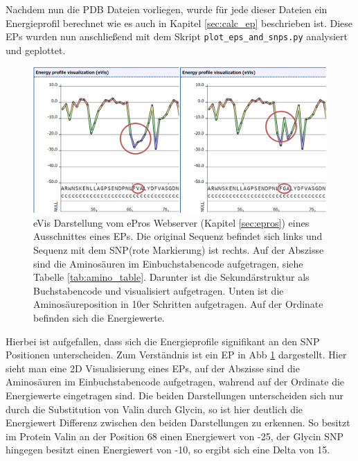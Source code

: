 Nachdem nun die \ac{PDB} Dateien vorliegen, wurde für jede dieser Dateien ein Energieprofil berechnet wie es auch in Kapitel \ref{sec:calc_ep} beschrieben ist. Diese \ac{EP}s wurden nun anschließend mit dem Skript \texttt{plot\_eps\_and\_snps.py} analysiert und geplottet. 
%
\begin{figure}
    \centering
    \includegraphics[width=.99\textwidth]{images/ep_vs_snp.png}
    \caption{\ac{eVis} Darstellung vom ePros Webserver (Kapitel \ref{sec:epros}) eines Ausschnittes eines \ac{EP}s. Die original Sequenz befindet sich links und Sequenz mit dem \ac{SNP}(rote Markierung) ist rechts. Auf der Abszisse sind die Aminosäuren im Einbuchstabencode aufgetragen, siehe Tabelle \ref{tab:amino_table}. Darunter ist die Sekundärstruktur als Buchstabencode und visualisiert aufgetragen. Unten ist die Aminosäureposition in 10er Schritten aufgetragen. Auf der Ordinate befinden sich die Energiewerte.}
    \label{fig:ep_vs_snp}
\end{figure}

Hierbei ist aufgefallen, dass sich die Energieprofile signifikant an den \ac{SNP} Positionen unterscheiden. Zum Verständnis ist ein \ac{EP} in \ac{Abb} \ref{fig:ep_vs_snp} dargestellt. Hier sieht man eine 2D Visualisierung eines \ac{EP}s, auf der Abszisse sind die Aminosäuren im Einbuchstabencode aufgetragen, wahrend auf der Ordinate die Energiewerte eingetragen sind. Die beiden Darstellungen unterscheiden sich nur durch die Substitution von Valin durch Glycin, so ist hier deutlich die Energiewert Differenz zwischen den beiden Darstellungen zu erkennen. So besitzt im Protein Valin an der Position 68 einen Energiewert von -25, der Glycin \ac{SNP} hingegen besitzt einen Energiewert von -10, so ergibt sich eine Delta von 15.

